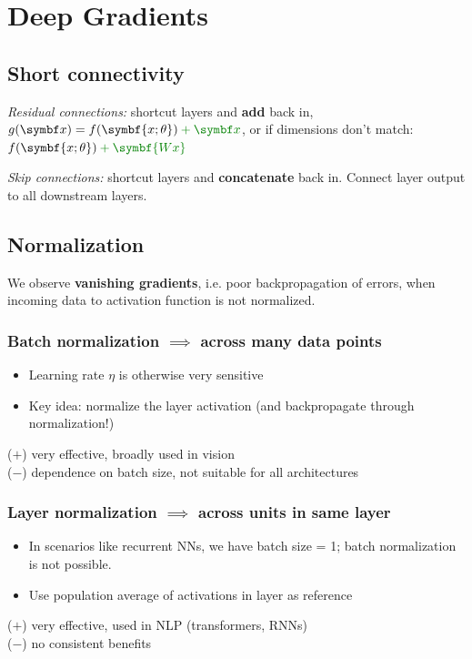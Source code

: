 
\section{Deep Gradients}\label{sec:deep-gradients}


\subsection{Short connectivity}

\emph{Residual connections:}\enskip
shortcut layers and \textbf{add} back in,\enskip $g(\symbf x) = f(\symbf{x; \theta}) \green + \symbf x$, or if dimensions don't match: $f(\symbf{x; \theta}) \green + \symbf{Wx}$

\emph{Skip connections:}\enskip
shortcut layers and \textbf{concatenate} back in.
Connect layer output to all downstream layers.


\subsection{Normalization}

We observe \textbf{vanishing gradients}, i.e. poor backpropagation of errors, when incoming data to activation function is not normalized.


\subsubsection{Batch normalization \enskip\mdseries $\implies$ across many data points}

\begin{itemize}
    \item Learning rate $\eta$ is otherwise very sensitive
    \item Key idea: normalize the layer activation (and backpropagate through normalization!)
\end{itemize}
($+$) very effective, broadly used in vision\\
($-$) dependence on batch size, not suitable for all architectures


\subsubsection{Layer normalization \enskip\mdseries $\implies$ across units in same layer}

\begin{itemize}
    \item In scenarios like recurrent NNs, we have batch size = 1; batch normalization is not possible.
    \item Use population average of activations in layer as reference
\end{itemize}
($+$) very effective, used in NLP (transformers, RNNs)\\
($-$) no consistent benefits
